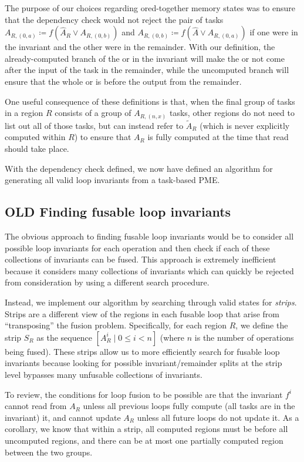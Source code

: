 \documentclass[12pt,letterpaper]{article}
\newcommand*{\opf}{f}
\begin{document}
The purpose of our choices regarding ored-together memory states was to ensure that the dependency check would not reject the pair of tasks $A_{R, (0, a)} \coloneqq f(\hat{A}_R \vee A_{R, (0, b)})$ and $A_{R, (0, b)} \coloneqq f(\hat{A} \vee A_{R, (0, a)})$ if one were in the invariant and the other were in the remainder.
With our definition, the already-computed branch of the or in the invariant will make the or not come after the input of the task in the remainder, while the uncomputed branch will ensure that the whole or is before the output from the remainder.

One useful consequence of these definitions is that, when the final group of tasks in a region $R$ consists of a group of $A_{R, (n, x)}$ tasks, other regions do not need to list out all of those tasks, but can instead refer to $\widetilde{A}_R$ (which is never explicitly computed within $R$) to ensure that $A_R$ is fully computed at the time that read should take place.

With the dependency check defined, we now have defined an algorithm for generating all valid loop invariants from a task-based PME.
\subsection{OLD Finding fusable loop invariants}
The obvious approach to finding fusable loop invariants would be to consider all possible loop invariants for each operation and then check if each of these collections of invariants can be fused.
This approach is extremely inefficient because it considers many collections of invariants which can quickly be rejected from consideration by using a different search procedure.

Instead, we implement our algorithm by searching through valid states for \emph{strips}.
Strips are a different view of the regions in each fusable loop that arise from ``transposing'' the fusion problem.
Specifically, for each region $R$, we define the strip $S_R$ as the sequence $[A_R^i \mid 0 \leq i < n]$ (where $n$ is the number of operations being fused).
These strips allow us to more efficiently search for fusable loop invariants because looking for possible invariant/remainder splits at the strip level bypasses many unfusable collections of invariants.

To review, the conditions for loop fusion to be possible are that the invariant $\opf^i$ cannot read from $A_R$ unless all previous loops fully compute (all tasks are in the invariant) it, and cannot update $A_R$ unless all future loops do not update it.
As a corollary, we know that within a strip, all computed regions must be before all uncomputed regions, and there can be at most one partially computed region between the two groups.
\end{document}
